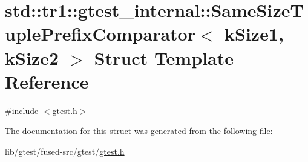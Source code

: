 \hypertarget{structstd_1_1tr1_1_1gtest__internal_1_1_same_size_tuple_prefix_comparator}{\section{std\-:\-:tr1\-:\-:gtest\-\_\-internal\-:\-:Same\-Size\-Tuple\-Prefix\-Comparator$<$ k\-Size1, k\-Size2 $>$ Struct Template Reference}
\label{structstd_1_1tr1_1_1gtest__internal_1_1_same_size_tuple_prefix_comparator}
}


{\ttfamily \#include $<$gtest.\-h$>$}



The documentation for this struct was generated from the following file\-:\begin{DoxyCompactItemize}
\item 
lib/gtest/fused-\/src/gtest/\hyperlink{fused-src_2gtest_2gtest_8h}{gtest.\-h}\end{DoxyCompactItemize}
